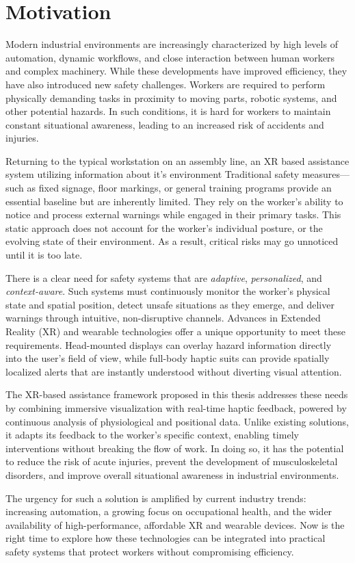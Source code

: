 \chapter{Motivation}
\label{chap:motivation}
Modern industrial environments are increasingly characterized by high levels of automation, dynamic workflows, and close interaction between human workers and complex machinery. While these developments have improved efficiency, they have also introduced new safety challenges. Workers are required to perform physically demanding tasks in proximity to moving parts, robotic systems, and other potential hazards. In such conditions, it is hard for workers to maintain constant situational awareness, leading to an increased risk of accidents and injuries.

Returning to the typical workstation on an assembly line, an XR based assistance system utilizing information about it's environment  
Traditional safety measures—such as fixed signage, floor markings, or general training programs provide an essential baseline but are inherently limited. They rely on the worker’s ability to notice and process external warnings while engaged in their primary tasks. This static approach does not account for the worker’s individual posture, or the evolving state of their environment. As a result, critical risks may go unnoticed until it is too late.

There is a clear need for safety systems that are \textit{adaptive}, \textit{personalized}, and \textit{context-aware}. Such systems must continuously monitor the worker’s physical state and spatial position, detect unsafe situations as they emerge, and deliver warnings through intuitive, non-disruptive channels. Advances in Extended Reality (XR) and wearable technologies offer a unique opportunity to meet these requirements. Head-mounted displays can overlay hazard information directly into the user’s field of view, while full-body haptic suits can provide spatially localized alerts that are instantly understood without diverting visual attention.

The XR-based assistance framework proposed in this thesis addresses these needs by combining immersive visualization with real-time haptic feedback, powered by continuous analysis of physiological and positional data. Unlike existing solutions, it adapts its feedback to the worker’s specific context, enabling timely interventions without breaking the flow of work. In doing so, it has the potential to reduce the risk of acute injuries, prevent the development of musculoskeletal disorders, and improve overall situational awareness in industrial environments.

The urgency for such a solution is amplified by current industry trends: increasing automation, a growing focus on occupational health, and the wider availability of high-performance, affordable XR and wearable devices. Now is the right time to explore how these technologies can be integrated into practical safety systems that protect workers without compromising efficiency.
